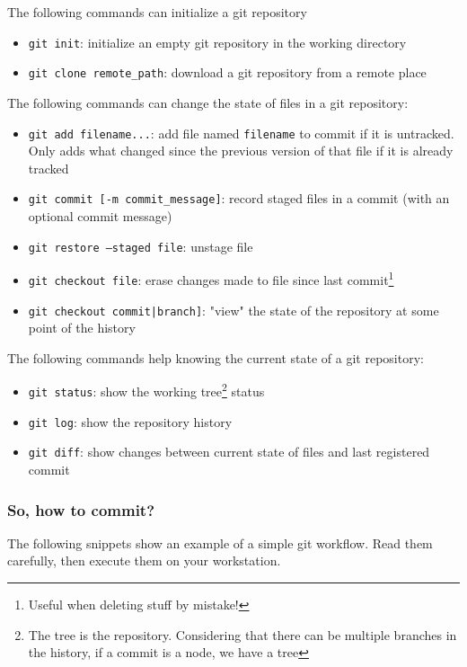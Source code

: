 \documentclass[12pt]{article}
\begin{document}
The following commands can initialize a git repository
\begin{itemize}
\item \texttt{git init}: initialize an empty git repository in the working directory
\item \texttt{git clone remote\_path}: download a git repository from a remote place
\end{itemize}

The following commands can change the state of files in a git repository:
\begin{itemize}
\item \texttt{git add filename...}: add file named \texttt{filename} to commit if it is untracked. Only adds what changed since the previous version of that file if it is already tracked
\item \texttt{git commit [-m commit\_message]}: record staged files in a commit (with an optional commit message)
\item \texttt{git restore --staged file}: unstage file
\item \texttt{git checkout file}: erase changes made to file since last commit\footnote{Useful when deleting stuff by mistake!}
\item \texttt{git checkout commit|branch]}: "view" the state of the repository at some point of the history
\end{itemize}

The following commands help knowing the current state of a git repository:
\begin{itemize}
\item \texttt{git status}: show the working tree\footnote{The tree is the repository. Considering that there can be multiple branches in the history, if a commit is a node, we have a tree} status
\item \texttt{git log}: show the repository history
\item \texttt{git diff}: show changes between current state of files and last registered commit
\end{itemize}


\subsubsection{So, how to commit?}

The following snippets show an example of a simple git workflow. Read them carefully, then execute them on your workstation.
\end{document}
